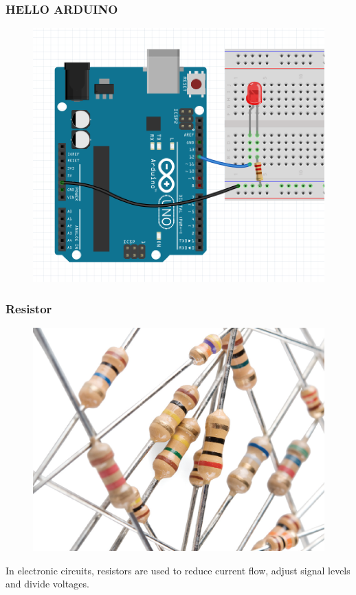 \begin{frame}
	\frametitle{HELLO ARDUINO}
	\begin{figure}
   		\includegraphics[scale=.55]{assets/hello} 
	\end{figure}
\end{frame}

\begin{frame}
	\frametitle{Resistor}
	\begin{figure}
   		\includegraphics[scale=.2]{assets/resistor} 
	\end{figure}
	In electronic circuits, resistors are used to reduce current flow, adjust signal levels and divide voltages.
\end{frame}

